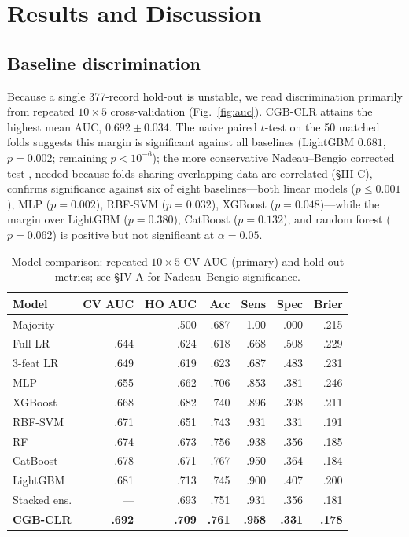 \documentclass[conference]{IEEEtran}
\begin{document}
\section{Results and Discussion}

\subsection{Baseline discrimination}

Because a single 377-record hold-out is unstable, we read discrimination
primarily from repeated $10\times5$ cross-validation (Fig.~\ref{fig:auc}).
CGB-CLR attains the highest mean AUC, $0.692\pm0.034$. The naive paired
$t$-test on the 50 matched folds suggests this margin is significant against
all baselines (LightGBM $0.681$, $p{=}0.002$; remaining $p<10^{-6}$); the more
conservative Nadeau--Bengio corrected test \cite{nadeau2003}, needed because
folds sharing overlapping data are correlated (\S III-C), confirms
significance against six of eight baselines---both linear models
($p\leq0.001$), MLP ($p{=}0.002$), RBF-SVM ($p{=}0.032$), XGBoost
($p{=}0.048$)---while the margin over LightGBM ($p{=}0.380$), CatBoost
($p{=}0.132$), and random forest ($p{=}0.062$) is positive but not significant
at $\alpha{=}0.05$.

\begin{table}[!t]
\caption{Model comparison: repeated $10\times5$ CV AUC (primary) and hold-out
metrics; see \S IV-A for Nadeau--Bengio significance.}
\label{tab:results}\centering\footnotesize
\setlength{\tabcolsep}{3pt}
\begin{tabular}{|l|r|r|r|r|r|r|}\hline
\textbf{Model}&\textbf{CV AUC}&\textbf{HO AUC}&\textbf{Acc}&\textbf{Sens}&\textbf{Spec}&\textbf{Brier}\\\hline
Majority&---&.500&.687&1.00&.000&.215\\\hline
Full LR&.644&.624&.618&.668&.508&.229\\\hline
3-feat LR&.649&.619&.623&.687&.483&.231\\\hline
MLP&.655&.662&.706&.853&.381&.246\\\hline
XGBoost&.668&.682&.740&.896&.398&.211\\\hline
RBF-SVM&.671&.651&.743&.931&.331&.191\\\hline
RF&.674&.673&.756&.938&.356&.185\\\hline
CatBoost&.678&.671&.767&.950&.364&.184\\\hline
LightGBM&.681&.713&.745&.900&.407&.200\\\hline
Stacked ens.&---&.693&.751&.931&.356&.181\\\hline
\textbf{CGB-CLR}&\textbf{.692}&\textbf{.709}&\textbf{.761}&\textbf{.958}&\textbf{.331}&\textbf{.178}\\\hline
\end{tabular}
\end{table}
\end{document}
